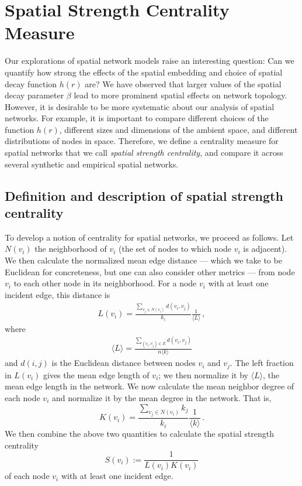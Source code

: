 \documentclass[%
 reprint,
 amsmath,amssymb,
 aps,
]{revtex4-1}
\begin{document}

\section{Spatial Strength Centrality Measure} \label{sec:spatial_strength}

Our explorations of spatial network models raise an interesting question: Can we quantify how strong the effects of the spatial embedding and choice of spatial decay function $h(r)$ are? We have observed that larger values of the spatial decay parameter $\beta$ lead to more prominent spatial effects on network topology. However, it is desirable to be more systematic about our analysis of spatial networks. For example, it is important to compare different choices of the function $h(r)$, different sizes and dimensions of the ambient space, and different distributions of nodes in space. Therefore, we define a centrality measure for spatial networks that we call \emph{spatial strength centrality}, and compare it across several synthetic and empirical spatial networks.


\subsection{Definition and description of spatial strength centrality}


To develop a notion of centrality for spatial networks, we proceed as follows. {\color{red}Let $N(v_i)$ the neighborhood of $v_i$ (the set of nodes to which node $v_i$ is adjacent)}.
We then calculate the {\color{red}normalized} mean edge distance --- which we take to be Euclidean for concreteness, but one can also consider other metrics --- from node $v_i$ to each other node in its neighborhood. For a node $v_i$ with at least one incident edge, this distance is
\begin{align}
    L(v_i) = \frac{\sum_{v_j \in N(v_i)}d(v_i, v_j)}{k_i} \frac{1}{{\langle L \rangle}}\,,
\label{eq:v_edge_length}
\end{align}
where
\begin{align}
    \langle L \rangle = \frac{\sum_{(v_i, v_j) \in E}d(v_i, v_j)}{n \langle k \rangle}
\end{align}
and $d(i, j)$ is the Euclidean distance between nodes $v_i$ and $v_j$. The left fraction in $L(v_i)$ gives the mean edge length of $v_i$; we then normalize it by $\langle L \rangle$, the mean edge length in the network. We now calculate the mean neighbor degree of each node $v_i$ and normalize it by the mean degree in the network. That is,
\begin{equation}
    K(v_i) = \frac{\sum_{v_j \in N(v_i)} k_j}{k_i} \frac{1}{\langle k \rangle}\,.
\end{equation}
We then combine the above two quantities to calculate the spatial strength centrality
\begin{equation} \label{eq:spatial_strength}
    S(v_i) := \frac{1}{L(v_i)K(v_i)}
\end{equation}
of each node $v_i$ with at least one incident edge.
\end{document}
